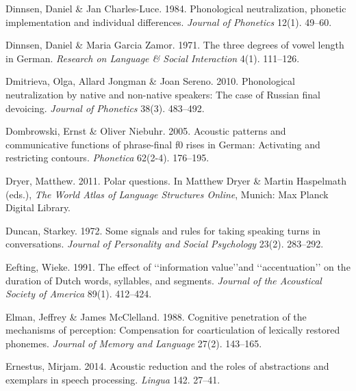 \documentclass[ number=1
,series=labphon
,output=long
,url=http://langsci-press.org/catalog/book/16
,isbn=978-3-944675-01-5
]{LSP/langsci}
\begin{document}
\begin{thebibliography}{284}
Dinnsen, Daniel \& Jan Charles-Luce. 1984.
\newblock Phonological neutralization, phonetic implementation and individual
  differences.
\newblock \emph{Journal of Phonetics} 12(1). 49--60.

Dinnsen, Daniel \& Maria {Garcia Zamor}. 1971.
\newblock The three degrees of vowel length in {G}erman.
\newblock \emph{Research on Language \& Social Interaction} 4(1). 111--126.

Dmitrieva, Olga, Allard Jongman \& Joan Sereno. 2010.
\newblock Phonological neutralization by native and non-native speakers: {T}he
  case of {R}ussian final devoicing.
\newblock \emph{Journal of Phonetics} 38(3). 483--492.

Dombrowski, Ernst \& Oliver Niebuhr. 2005.
\newblock Acoustic patterns and communicative functions of phrase-final f0
  rises in {G}erman: {A}ctivating and restricting contours.
\newblock \emph{Phonetica} 62(2-4). 176--195.

Dryer, Matthew. 2011.
\newblock Polar questions.
\newblock In Matthew Dryer \& Martin Haspelmath (eds.), \emph{{The World Atlas
  of Language Structures Online}}, Munich: Max Planck Digital Library.

Duncan, Starkey. 1972.
\newblock Some signals and rules for taking speaking turns in conversations.
\newblock \emph{Journal of Personality and Social Psychology} 23(2). 283--292.

\enlargethispage{\baselineskip}
Eefting, Wieke. 1991.
\newblock The effect of ‘‘information value’’and
  ‘‘accentuation’’ on the duration of {D}utch words, syllables, and
  segments.
\newblock \emph{Journal of the Acoustical Society of America} 89(1). 412--424.

Elman, Jeffrey \& James McClelland. 1988.
\newblock Cognitive penetration of the mechanisms of perception: {C}ompensation
  for coarticulation of lexically restored phonemes.
\newblock \emph{Journal of Memory and Language} 27(2). 143--165.

Ernestus, Mirjam. 2014.
\newblock Acoustic reduction and the roles of abstractions and exemplars in
  speech processing.
\newblock \emph{Lingua} 142. 27--41.


\end{thebibliography}
\end{document}
